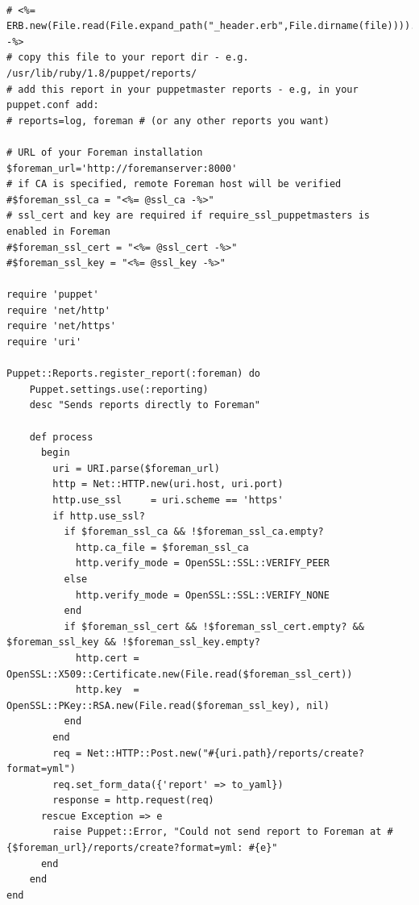 \codefont\tiny \begin{lstlisting}

# <%= ERB.new(File.read(File.expand_path("_header.erb",File.dirname(file)))).result(binding) -%>
# copy this file to your report dir - e.g. /usr/lib/ruby/1.8/puppet/reports/
# add this report in your puppetmaster reports - e.g, in your puppet.conf add:
# reports=log, foreman # (or any other reports you want)

# URL of your Foreman installation
$foreman_url='http://foremanserver:8000'
# if CA is specified, remote Foreman host will be verified
#$foreman_ssl_ca = "<%= @ssl_ca -%>"
# ssl_cert and key are required if require_ssl_puppetmasters is enabled in Foreman
#$foreman_ssl_cert = "<%= @ssl_cert -%>"
#$foreman_ssl_key = "<%= @ssl_key -%>"

require 'puppet'
require 'net/http'
require 'net/https'
require 'uri'

Puppet::Reports.register_report(:foreman) do
    Puppet.settings.use(:reporting)
    desc "Sends reports directly to Foreman"

    def process
      begin
        uri = URI.parse($foreman_url)
        http = Net::HTTP.new(uri.host, uri.port)
        http.use_ssl     = uri.scheme == 'https'
        if http.use_ssl?
          if $foreman_ssl_ca && !$foreman_ssl_ca.empty?
            http.ca_file = $foreman_ssl_ca
            http.verify_mode = OpenSSL::SSL::VERIFY_PEER
          else
            http.verify_mode = OpenSSL::SSL::VERIFY_NONE
          end
          if $foreman_ssl_cert && !$foreman_ssl_cert.empty? && $foreman_ssl_key && !$foreman_ssl_key.empty?
            http.cert = OpenSSL::X509::Certificate.new(File.read($foreman_ssl_cert))
            http.key  = OpenSSL::PKey::RSA.new(File.read($foreman_ssl_key), nil)
          end
        end
        req = Net::HTTP::Post.new("#{uri.path}/reports/create?format=yml")
        req.set_form_data({'report' => to_yaml})
        response = http.request(req)
      rescue Exception => e
        raise Puppet::Error, "Could not send report to Foreman at #{$foreman_url}/reports/create?format=yml: #{e}"
      end
    end
end

\end{lstlisting}
\fzsk\normalsize


